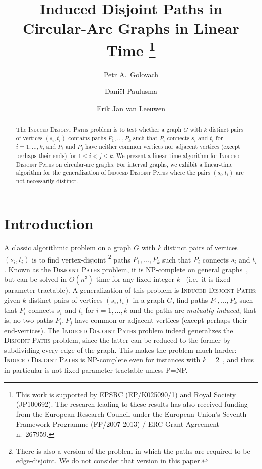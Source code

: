 \documentclass{llncs}
\newcommand{\sP}{{\sf P}}
\newcommand{\NP}{{\sf NP}}
\newcommand{\ie}{i.e.~}
\newcommand{\problemIDP}{\textsc{Induced Disjoint Paths}}
\newcommand{\problemDP}{\textsc{Disjoint Paths}}
\begin{document}
\title{Induced Disjoint Paths in\\ Circular-Arc Graphs in Linear Time
\thanks{This work is supported by EPSRC (EP/K025090/1) and Royal Society (JP100692).
The research leading to these results has also received funding from the European Research Council under the European Union's Seventh Framework Programme (FP/2007-2013) / ERC Grant Agreement n.\ 267959.}
}
\author{
Petr A.~Golovach
\and Dani\"el Paulusma
\and Erik Jan van Leeuwen
}
\maketitle
\thispagestyle{plain}
\setcounter{footnote}{0}

\begin{abstract}
The \problemIDP{} problem is to test whether a graph $G$ with $k$ distinct pairs of vertices $(s_{i},t_{i})$ contains paths $P_{1},\ldots,P_{k}$ such that $P_{i}$ connects $s_{i}$ and $t_{i}$ for $i=1,\ldots,k$, and $P_{i}$ and $P_{j}$ have neither common vertices nor adjacent vertices (except perhaps their ends) for $1 \leq i < j \leq k$.
We present a linear-time algorithm for \problemIDP{} on circular-arc graphs.
For interval graphs, we exhibit a linear-time algorithm for the generalization of \problemIDP{} where the pairs $(s_{i},t_{i})$ are not necessarily distinct.
\end{abstract}

\section{Introduction}\label{s-intro}
A classic algorithmic problem on a graph $G$ with $k$ distinct pairs of vertices $(s_{i},t_{i})$ is to find vertex-disjoint
\footnote{There is also a version of the problem in which the paths are required to be edge-disjoint. We do not consider that version in this paper.} 
paths $P_{1},\ldots,P_{k}$ such that $P_{i}$ connects $s_{i}$ and $t_{i}$. Known as the \problemDP{} problem, it is \NP-complete on general graphs~\cite{Ka75}, but can be solved in $O(n^{3})$ time for any fixed integer $k$~\cite{RS95} (\ie it is fixed-parameter tractable). A generalization of this problem is \problemIDP{}: given $k$ distinct pairs of vertices $(s_{i},t_{i})$ in a graph $G$, find paths $P_{1},\ldots,P_{k}$ such that $P_{i}$ connects $s_{i}$ and $t_{i}$ for $i=1,\ldots,k$ and the paths are \emph{mutually induced}, that is, no two paths $P_{i},P_{j}$ have common or adjacent vertices (except perhaps their end-vertices). The \problemIDP{} problem indeed generalizes the \problemDP{} problem, since the latter can be reduced to the former by subdividing every edge of the graph. This makes the problem much harder: \problemIDP{} is \NP-complete even for instances with $k=2$~\cite{Bi91,Fe89}, and thus in particular is not fixed-parameter tractable unless \sP=\NP.
\end{document}
